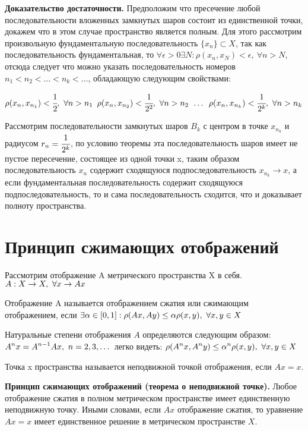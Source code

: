 \documentclass[12pt]{report}
\renewcommand{\[}{$\\\displaystyle}
\renewcommand{\]}{\\$}
\renewcommand{\[}{$\\\displaystyle}
\newcommand{\sep}{,\ }
\begin{document}
\textbf{Доказательство достаточности.} Предположим что пресечение любой
последовательности вложенных замкнутых шаров состоит из единственной точки,
докажем что в этом случае пространство является полным. Для этого рассмотрим
произвольную фундаментальную последовательность $\{x_{n}\} \subset X$, так как
последовательность фундаментальная, то
$\forall \epsilon > 0 \exists N: \rho(x_n, x_N) < \epsilon\sep \forall n > N$,
отсюда следует что можно указать последовательность номеров
$n_1 < n_2 <\dots < n_k < \dots $, обладающую следующим свойствами:

\[\rho(x_n, x_{n_1}) < \cfrac{1}{2}\sep \forall n > n_{1} \]
\[\rho(x_n, x_{n_2}) < \cfrac{1}{2^{2}}\sep \forall n > n_{2} \]
\[\dots \]
\[\rho(x_n, x_{n_k}) < \cfrac{1}{2^{k}}\sep \forall n > n_{k} \]


Рассмотрим последовательности замкнутых шаров $B_k$ с центром в точке $x_{n_k}$ и
радиусом $r_n = \cfrac{1}{2^{k}}$, по условию теоремы эта последовательность
шаров имеет не пустое пересечение, состоящее из одной точки x, таким образом
последовательность $x_n$ содержит сходящуюся подпоследовательность
$x_{n_k} \rightarrow x$, а если фундаментальная последовательность содержит
сходящуюся подпоследовательность, то и сама последовательность сходится, что и
доказывает полноту пространства.

\section{Принцип сжимающих отображений}

Рассмотрим отображение A метрического пространства X в себя.
\[ A: X \rightarrow X\sep \forall x \rightarrow Ax\]

Отображение A называется отображением сжатия или сжимающим отображением, если
\[ \exists \alpha \in [0, 1]: \rho(Ax, Ay) \leq \alpha \rho(x,y)\sep{}
\forall x, y \in X\]

Натуральные степени отображения $A$ определяются следующим образом:
\[ A^nx = A^{n-1}Ax\sep n=2, 3, \dots\]
легко видеть:
\[ \rho(A^nx, A^ny) \leq \alpha^n \rho(x, y)\sep \forall x, y \in X\]

Точка x пространства называется неподвижной точкой отображения, если $Ax = x$.

\textbf{Принцип сжимающих отображений (теорема о неподвижной точке).} Любое
отображение сжатия в полном метрическом пространстве имеет единственную
неподвижную точку. Иными словами, если $Ax$ отображение сжатия, то уравнение
$Ax = x$ имеет единственное решение в метрическом пространстве $X$.
\end{document}
